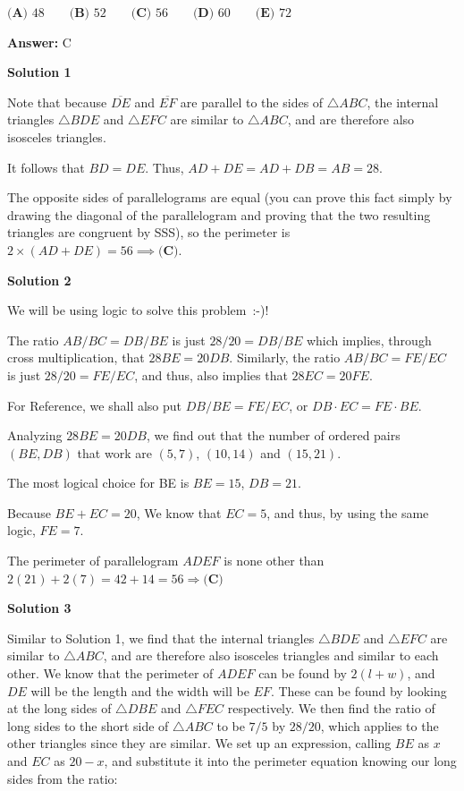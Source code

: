 \begin{enumerate}
$\textbf{(A) }48\qquad \textbf{(B) }52\qquad \textbf{(C) }56\qquad \textbf{(D) }60\qquad \textbf{(E) }72\qquad$

 \textbf{Answer: }C



\textbf{Solution 1}

Note that because $\overline{DE}$ and $\overline{EF}$ are parallel to the sides of $\triangle ABC$, the internal triangles $\triangle BDE$ and $\triangle EFC$ are similar to $\triangle ABC$, and are therefore also isosceles triangles.

 It follows that $BD = DE$. Thus, $AD + DE = AD + DB = AB = 28$.

 The opposite sides of parallelograms are equal (you can prove this fact simply by drawing the diagonal of the parallelogram and proving that the two resulting triangles are congruent by SSS), so the perimeter is $2 \times (AD + DE) = 56\implies \boxed{\textbf{(C)}}$.

 



\textbf{Solution 2}

We will be using logic to solve this problem :-)! 

 The ratio \( AB/BC = DB/BE \) is just \( 28/20 = DB/BE \) which implies, through cross multiplication, that \( 28BE = 20DB \). Similarly, the ratio \( AB/BC = FE/EC \) is just \( 28/20 = FE/EC \), and thus, also implies that \( 28EC = 20FE \). 

 For Reference, we shall also put \( DB/BE = FE/EC \), or \( DB \cdot EC = FE \cdot BE \). 

 Analyzing \( 28BE=20DB \), we find out that the number of ordered pairs \( (BE,DB) \) that work are \( (5, 7) \), \( (10, 14) \) and \( (15, 21) \). 

 The most logical choice for BE is \( BE = 15 \), \( DB = 21 \). 

 Because \( BE + EC = 20 \), We know that \( EC = 5 \), and thus, by using the same logic, \( FE = 7 \). 

 The perimeter of parallelogram \( ADEF \) is none other than \( 2(21) + 2(7) = 42 + 14 = \)$\boxed{56 \Rightarrow \textbf{(C)}}$




\textbf{Solution 3}

Similar to Solution 1, we find that the internal triangles $\triangle BDE$ and $\triangle EFC$ are similar to $\triangle ABC$, and are therefore also isosceles triangles and similar to each other. We know that the perimeter of $ADEF$ can be found by $2(l + w)$, and $DE$ will be the length and the width will be $EF$. These can be found by looking at the long sides of $\triangle DBE$ and $\triangle FEC$ respectively. We then find the ratio of long sides to the short side of $\triangle ABC$ to be $7/5$ by $28/20$, which applies to the other triangles since they are similar. We set up an expression, calling $BE$ as $x$ and $EC$ as $20 - x$, and substitute it into the perimeter equation knowing our long sides from the ratio:


\end{enumerate}
